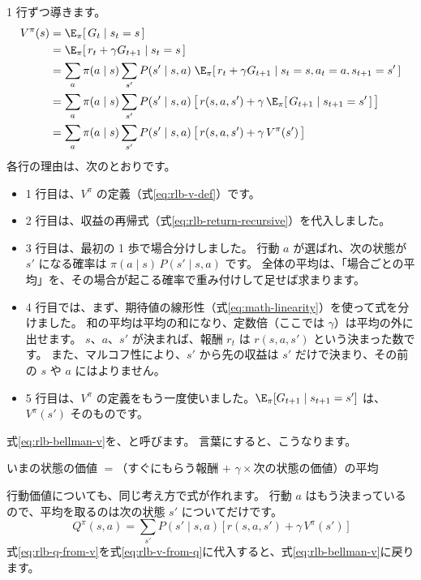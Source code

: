 1 行ずつ導きます。
\begin{align}
V^\pi(s)
&=\E_\pi[\,G_t\mid s_t=s\,] \notag\\
&=\E_\pi[\,r_t+\gamma G_{t+1}\mid s_t=s\,] \notag\\
&=\sum_a\pi(a\mid s)\sum_{s'}P(s'\mid s,a)\;
  \E_\pi[\,r_t+\gamma G_{t+1}\mid s_t=s,a_t=a,s_{t+1}=s'\,] \notag\\
&=\sum_a\pi(a\mid s)\sum_{s'}P(s'\mid s,a)\,
  \bigl[\,r(s,a,s')+\gamma\,\E_\pi[\,G_{t+1}\mid s_{t+1}=s'\,]\,\bigr] \notag\\
&=\sum_a\pi(a\mid s)\sum_{s'}P(s'\mid s,a)\,
  \bigl[\,r(s,a,s')+\gamma\,V^\pi(s')\,\bigr]
\label{eq:rlb-bellman-v}
\end{align}
各行の理由は、次のとおりです。
\begin{itemize}
\item 1 行目は、$V^\pi$ の定義（式\eqref{eq:rlb-v-def}）です。
\item 2 行目は、収益の再帰式（式\eqref{eq:rlb-return-recursive}）を代入しました。
\item 3 行目は、最初の 1 歩で場合分けしました。
行動 $a$ が選ばれ、次の状態が $s'$ になる確率は $\pi(a\mid s)\,P(s'\mid s,a)$ です。
全体の平均は、「場合ごとの平均」を、その場合が起こる確率で重み付けして足せば求まります。
\item 4 行目では、まず、期待値の線形性（式\eqref{eq:math-linearity}）を使って式を分けました。
和の平均は平均の和になり、定数倍（ここでは $\gamma$）は平均の外に出せます。
$s$、$a$、$s'$ が決まれば、報酬 $r_t$ は $r(s,a,s')$ という決まった数です。
また、マルコフ性により、$s'$ から先の収益は $s'$ だけで決まり、その前の $s$ や $a$ にはよりません。
\item 5 行目は、$V^\pi$ の定義をもう一度使いました。$\E_\pi[G_{t+1}\mid s_{t+1}=s']$ は、$V^\pi(s')$ そのものです。
\end{itemize}

式\eqref{eq:rlb-bellman-v}を、と呼びます\cite{bellman1957dynamic}。
言葉にすると、こうなります。
\begin{center}
いまの状態の価値 $=$（すぐにもらう報酬 $+$ $\gamma\times$次の状態の価値）の平均
\end{center}

行動価値についても、同じ考え方で式が作れます。
行動 $a$ はもう決まっているので、平均を取るのは次の状態 $s'$ についてだけです。
\begin{equation}
Q^\pi(s,a)=\sum_{s'}P(s'\mid s,a)\,\bigl[\,r(s,a,s')+\gamma\,V^\pi(s')\,\bigr]
\label{eq:rlb-q-from-v}
\end{equation}
式\eqref{eq:rlb-q-from-v}を式\eqref{eq:rlb-v-from-q}に代入すると、式\eqref{eq:rlb-bellman-v}に戻ります。

